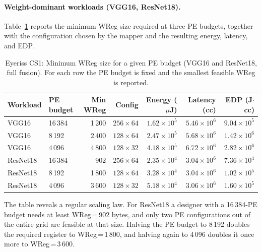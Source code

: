 \paragraph{Weight-dominant workloads (VGG16, ResNet18).}

Table~\ref{tab:eyeriss-cs1-wreg} reports the minimum WReg size
required at three PE budgets, together with the configuration chosen
by the mapper and the resulting energy, latency, and EDP.

\begin{table}[htbp]
  \centering
  \caption{Eyeriss CS1: Minimum WReg size for a given PE budget
    (VGG16 and ResNet18, full fusion).
    For each row the PE budget is fixed and the smallest feasible WReg
    is reported.}
  \label{tab:eyeriss-cs1-wreg}
  \begin{tabular}{llrrrrr}
    \toprule
    Workload & PE budget & Min WReg & Config & Energy ($\mu$J) &
      Latency (cc) & EDP (J$\cdot$cc) \\
    \midrule
    VGG16    & 16\,384 & 1\,200  & $256 \times 64$  & $1.62 \times 10^{5}$
             & $5.46 \times 10^{6}$ & $9.04 \times 10^{5}$ \\
    VGG16    & 8\,192  & 2\,400  & $128 \times 64$  & $2.47 \times 10^{5}$
             & $5.68 \times 10^{6}$ & $1.42 \times 10^{6}$ \\
    VGG16    & 4\,096  & 4\,800  & $128 \times 32$  & $4.18 \times 10^{5}$
             & $6.72 \times 10^{6}$ & $2.82 \times 10^{6}$ \\
    \midrule
    ResNet18 & 16\,384 & 902     & $256 \times 64$  & $2.35 \times 10^{4}$
             & $3.04 \times 10^{6}$ & $7.36 \times 10^{4}$ \\
    ResNet18 & 8\,192  & 1\,800  & $128 \times 64$  & $3.28 \times 10^{4}$
             & $3.04 \times 10^{6}$ & $1.02 \times 10^{5}$ \\
    ResNet18 & 4\,096  & 3\,600  & $128 \times 32$  & $5.18 \times 10^{4}$
             & $3.06 \times 10^{6}$ & $1.60 \times 10^{5}$ \\
    \bottomrule
  \end{tabular}
\end{table}

The table reveals a regular scaling law.
For ResNet18 a designer with a 16\,384-PE budget needs at least
WReg\,=\,902 bytes, and only two PE configurations out of the entire
grid are feasible at that size.
Halving the PE budget to 8\,192 doubles the required register to
WReg\,=\,1\,800, and halving again to 4\,096 doubles it once more to
WReg\,=\,3\,600.

